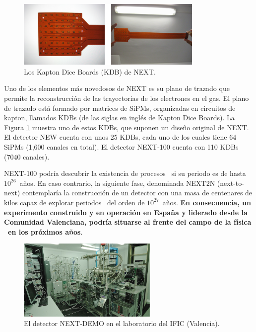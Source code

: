 \begin{figure}
\centering
\includegraphics[width=0.8\textwidth]{img/KDB.png}
\caption{\small Los Kapton Dice Boards (KDB) de NEXT.} \label{fig.KDB}
\end{figure} 


Uno de los elementos más novedosos de NEXT es su plano de trazado que permite la reconstrucción de las trayectorias de los electrones en el gas. El plano de trazado está formado por matrices de SiPMs, organizadas en circuitos de kapton, llamados KDBs (de las siglas en inglés de Kapton Dice Boards). La Figura \ref{fig.KDB} muestra uno de estos KDBs, que suponen un diseño original de NEXT. El detector NEW cuenta con unos 25 KDBs, cada uno de los cuales tiene 64 SiPMs (1,600 canales en total). El detector NEXT-100 cuenta con 110 KDBs  (7040 canales).  

NEXT-100 podría descubrir la existencia de procesos \bbonu\ si su periodo es de hasta $10^{26}$~años. En caso contrario, la siguiente fase, denominada NEXT2N (next-to-next) contemplaría la construcción de un detector con una masa de centenares de kilos capaz de explorar periodos \Tonu\ del orden de $10^{27}$~años. {\bf En consecuencia, un experimento construido y en operación en España y liderado desde la Comunidad Valenciana, podría situarse al frente del campo de la física \bbonu\ en los próximos años}.
 
 
\begin{figure}
\centering
\includegraphics[width=0.6\textwidth]{img/DemoSetup.png}
\caption{\small El detector NEXT-DEMO en el laboratorio del IFIC (Valencia).} \label{fig.DEMO}
\end{figure}

